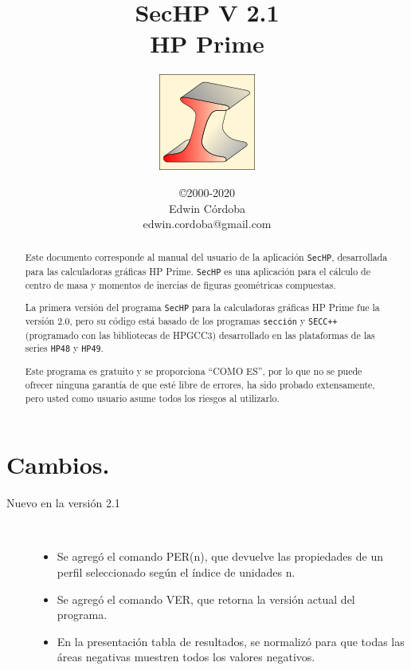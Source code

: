 \documentclass[spanish,xcolor=pdftex,dvipsnames,table,mathserif]{scrartcl}
\title{SecHP V 2.1\\HP Prime}
\subtitle{\includegraphics{./imagenes/icon} }
\author{\normalfont \sffamily ©2000-2020\\Edwin Córdoba\\edwin.cordoba@gmail.com}
\begin{document}
\thispagestyle{empty}
\maketitle
\thispagestyle{empty}
\begin{abstract}
Este documento corresponde al manual del usuario de la aplicación \verb|SecHP|, desarrollada para las calculadoras gráficas HP Prime. \verb|SecHP| es una aplicación para el cálculo de centro de masa y momentos de inercias de figuras geométricas compuestas.

\noindent La primera versión del programa \verb|SecHP| para la calculadoras gráficas HP Prime fue la versión 2.0, pero su código está basado de los programas \verb|sección| y \verb|SECC++|(programado con las bibliotecas de HPGCC3) desarrollado en las plataformas de las series \verb|HP48| y \verb|HP49|.

\noindent Este programa es gratuito y se proporciona ``COMO ES'', por lo que no se puede ofrecer ninguna garantía de que esté libre de errores, ha sido probado extensamente, pero usted como usuario asume todos los riesgos al utilizarlo.

\end{abstract}
\newpage
\thispagestyle{empty}
\renewcommand{\contentsname}{TABLA DE CONTENIDO}
\tableofcontents
\newpage
\thispagestyle{empty}
\listoftables
\newpage
\thispagestyle{empty}
\listoffigures
\newpage
\setcounter{page}{1}
\section{Cambios.}
\begin{description}
	\item[Nuevo en la versión 2.1] ~
	\begin{itemize}
		\item Se agregó el comando PER(n), que devuelve las propiedades de un perfil seleccionado según el índice de  unidades n.
		\item Se agregó el comando VER, que retorna la versión actual del programa.
		\item En la presentación tabla de resultados, se normalizó para que todas las áreas negativas muestren todos los valores negativos.
	\end{itemize}
\end{description}
\end{document}
